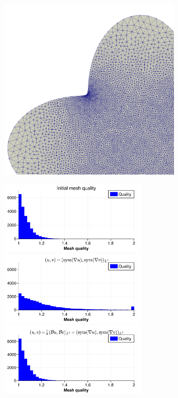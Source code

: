 \documentclass[aspectratio=1610]{beamer}
\begin{document}
\begin{frame}
    \begin{center}
        \includegraphics[width=0.67\textwidth]{./img/levelset/CR_sym_grad_1e-2_mesh.png}
    \end{center}
\end{frame}\begin{frame}
    \vspace{1em}
    \begin{adjustwidth}{-4em}{-4em}
        \begin{center}
            \includegraphics[width=0.54\textwidth]{./img/levelset/CR_grad_1e_2_mesh_quality_initial.png}\\\pause
            \includegraphics[width=0.54\textwidth]{./img/levelset/sym_grad_mesh_quality_final.png}
            \includegraphics[width=0.54\textwidth]{./img/levelset/CR_sym_grad_1e-2_mesh_quality_final.png}

\end{center}
\end{adjustwidth}
\end{frame}
\end{document}
